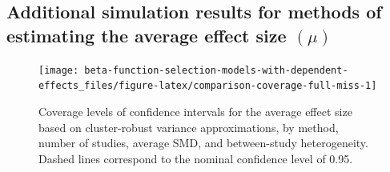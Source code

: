 \documentclass[
  american,
  man, donotrepeattitle,floatsintext]{apa7}
\begin{document}
\subsection{\texorpdfstring{Additional simulation results for methods of estimating the average effect size \((\mu)\)}{Additional simulation results for methods of estimating the average effect size (\textbackslash mu)}}\label{mu-simulation-results-miss}

\begin{figure}
\texttt{[image: beta-function-selection-models-with-dependent-effects\_files/figure-latex/comparison-coverage-full-miss-1]} \caption{Coverage levels of confidence intervals for the average effect size based on cluster-robust variance approximations, by method, number of studies, average SMD, and between-study heterogeneity. Dashed lines correspond to the nominal confidence level of 0.95.}\label{fig:comparison-coverage-full-miss}
\end{figure}
\end{document}
